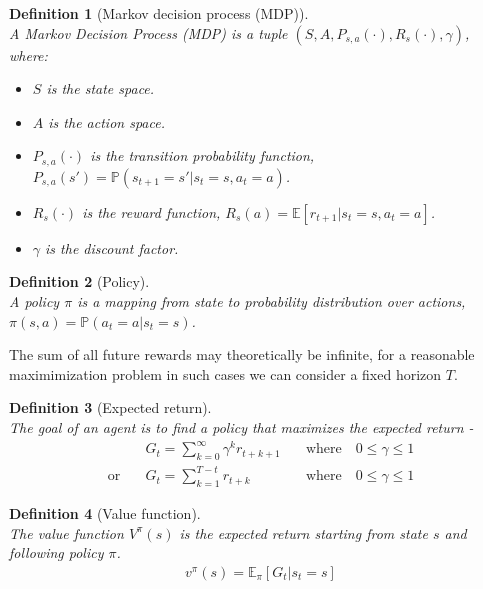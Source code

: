 \documentclass[11pt]{book} %
\newtheorem{definition}{Definition}[section]
\begin{document}
\begin{definition}[Markov decision process (MDP)]\ \\
    A Markov Decision Process (MDP) is a tuple $(S, A, P_{s,a}(\cdot) , R_s(\cdot), \gamma)$, where:
    \begin{itemize}
        \item $S$ is the state space.
        \item $A$ is the action space.
        \item $P_{s,a}(\cdot)$ is the transition probability function, $P_{s,a}(s') = \mathbb{P}(s_{t+1} = s' | s_t = s, a_t = a)$.
        \item $R_s(\cdot)$ is the reward function, $R_s(a) = \mathbb{E}[r_{t+1} | s_t = s, a_t = a]$.
        \item $\gamma$ is the discount factor.
    \end{itemize}    
    
\end{definition}

\begin {definition}[Policy]\ \\
    A policy $\pi$ is a mapping from state to probability distribution over actions, \\
    $\pi(s, a) = \mathbb{P}(a_t = a | s_t = s)$.

\end{definition}
The sum of all future rewards may theoretically be infinite, for a reasonable maximimization problem in such cases we can consider a fixed horizon $T$.

\begin {definition}[Expected return]\ \\
    The goal of an agent is to find a policy that maximizes the expected return -
    \begin{align*}
        &G_t = \sum_{k=0}^{\infty} \gamma^k r_{t+k+1} \quad &\text{where} \quad 0 \leq \gamma \leq 1 \\
        \text{or} \quad &G_t = \sum_{k=1}^{T-t}  r_{t+k} \quad &\text{where} \quad 0 \leq \gamma \leq 1
    \end{align*}
\end{definition}


\begin{definition}[Value function]\ \\
    The value function $V^{\pi}(s)$ is the expected return starting from state $s$ and following policy $\pi$.
    \begin{align*}
        v^{\pi}(s) = \mathbb{E}_{\pi} \left[ G_t | s_t = s \right]
    \end{align*}
\end{definition}
\end{document}
